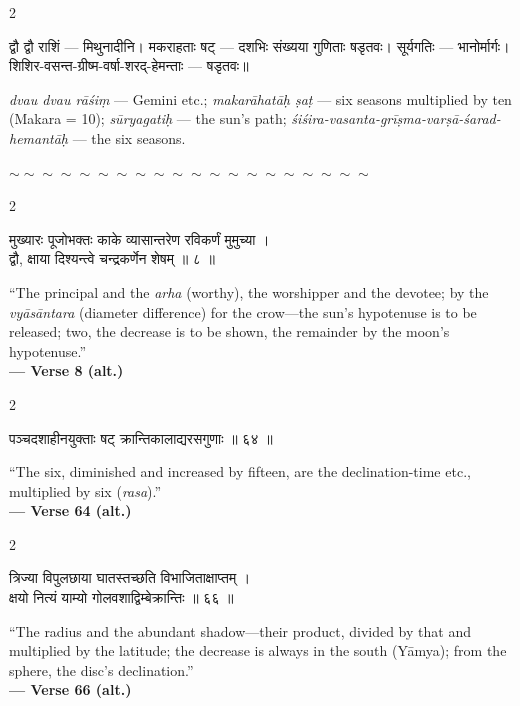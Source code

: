 \documentclass[11pt,a4paper]{article}
\newcommand{\dev}[1]{{\devanagarifont #1}}
\newenvironment{bilingualverse}{%
  \begin{paracol}{2}
  \fontsize{10.5}{13}\selectfont
}{%
  \end{paracol}
  \vspace{0.3cm}
}
\newcommand{\wavydivider}{\begin{center}$\sim\sim\sim\sim\sim\sim\sim\sim\sim\sim\sim\sim\sim\sim\sim\sim\sim\sim\sim\sim$\end{center}}
\begin{document}
\begin{paracol}{2}
\begin{leftcolumn*}
\dev{द्वौ द्वौ राशिं} — मिथुनादीनि। \dev{मकराहताः षट्} — दशभिः संख्यया गुणिताः षडृतवः। \dev{सूर्यगतिः} — भानोर्मार्गः। \dev{शिशिर-वसन्त-ग्रीष्म-वर्षा-शरद्-हेमन्ताः} — षडृतवः॥
\end{leftcolumn*}
\begin{rightcolumn}
\textit{dvau dvau rāśiṃ} --- Gemini etc.; \textit{makarāhatāḥ ṣaṭ} --- six seasons multiplied by ten (Makara = 10); \textit{sūryagatiḥ} --- the sun's path; \textit{śiśira-vasanta-grīṣma-varṣā-śarad-hemantāḥ} --- the six seasons.
\end{rightcolumn}
\end{paracol}

\vspace{0.3cm}

\wavydivider

\begin{bilingualverse}
\begin{leftcolumn*}
\dev{मुख्यारः पूजोभक्तः काके व्यासान्तरेण रविकर्णं मुमुच्या ।}\\
\dev{द्वौ, क्षाया दिश्यन्त्वे चन्द्रकर्णेन शेषम् ॥ ८ ॥}
\end{leftcolumn*}
\begin{rightcolumn}
``The principal and the \textit{arha} (worthy), the worshipper and the devotee; by the \textit{vyāsāntara} (diameter difference) for the crow---the sun's hypotenuse is to be released; two, the decrease is to be shown, the remainder by the moon's hypotenuse.''\\[0.3cm]
\hfill\textbf{— Verse 8 (alt.)}
\end{rightcolumn}
\end{bilingualverse}

\begin{bilingualverse}
\begin{leftcolumn*}
\dev{पञ्चदशाहीनयुक्ताः षट् क्रान्तिकालाद्यरसगुणाः ॥ ६४ ॥}
\end{leftcolumn*}
\begin{rightcolumn}
``The six, diminished and increased by fifteen, are the declination-time etc., multiplied by six (\textit{rasa}).''\\[0.3cm]
\hfill\textbf{— Verse 64 (alt.)}
\end{rightcolumn}
\end{bilingualverse}

\begin{bilingualverse}
\begin{leftcolumn*}
\dev{त्रिज्या विपुलछाया घातस्तच्छति विभाजिताक्षाप्तम् ।}\\
\dev{क्षयो नित्यं याम्यो गोलवशाद्विम्बेक्रान्तिः ॥ ६६ ॥}
\end{leftcolumn*}
\begin{rightcolumn}
``The radius and the abundant shadow---their product, divided by that and multiplied by the latitude; the decrease is always in the south (Yāmya); from the sphere, the disc's declination.''\\[0.3cm]
\hfill\textbf{— Verse 66 (alt.)}
\end{rightcolumn}
\end{bilingualverse}
\end{document}
